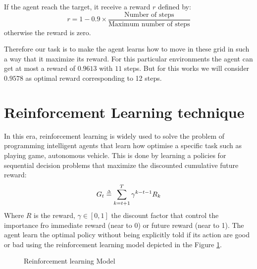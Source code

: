 If the agent reach the target, it receive a reward $r$ defined by:
\begin{equation}
	r = 1 - 0.9\times \frac{\text{Number of steps}}{\text{Maximum number of steps}}
\end{equation}
otherwise the reward is zero.


Therefore our task is to make the agent learns how to move in these grid in such a way that it maximize its reward. For this particular environments the agent can get at most a reward of $0.9613$ with $11$ steps. But for this works we will consider $0.9578$ as optimal reward corresponding to 12 steps.

\section{Reinforcement Learning technique}
In this era, reinforcement learning is widely used to solve the problem of programming intelligent agents that learn how optimise a specific task such as playing game, autonomous vehicle. This is done by learning a policies for sequential decision problems that maximize the discounted  cumulative future reward:
\begin{equation}
	G_t \overset{\scriptscriptstyle\Delta}{=} \sum_{k=t+1}^{T} \gamma^{k-t-1}R_k
\end{equation}
Where $R$ is the reward, $\gamma\in [0,1]$ the discount factor that control the importance fro immediate reward (near to 0) or future reward (near to 1). The agent learn the optimal policy without being explicitly told if its action are good or bad using the reinforcement learning model depicted in the Figure \ref{fig:RL}.


\begin{figure}
	\centering
{}
\caption{Reinforcement learning Model}
\label{fig:RL}
\end{figure}

